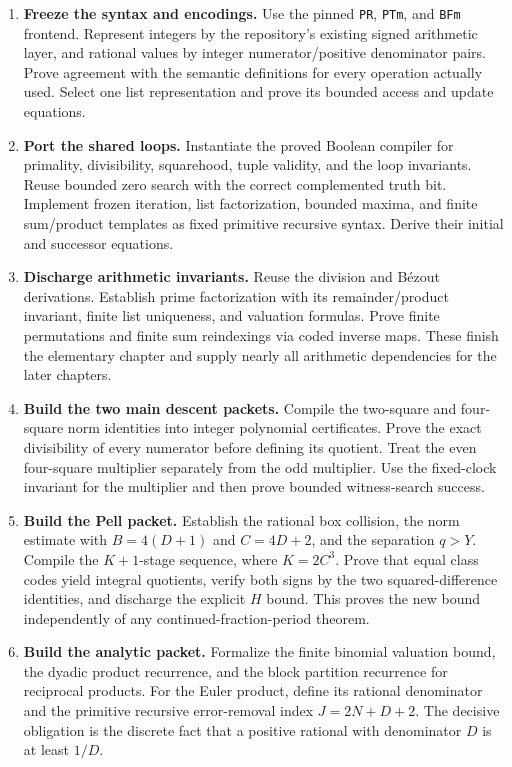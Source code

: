 \begin{enumerate}
\item \textbf{Freeze the syntax and encodings.} Use the pinned \texttt{PR}, \texttt{PTm}, and \texttt{BFm} frontend. Represent integers by the repository's existing signed arithmetic layer, and rational values by integer numerator/positive denominator pairs. Prove agreement with the semantic definitions for every operation actually used. Select one list representation and prove its bounded access and update equations.
\item \textbf{Port the shared loops.} Instantiate the proved Boolean compiler for primality, divisibility, squarehood, tuple validity, and the loop invariants. Reuse bounded zero search with the correct complemented truth bit. Implement frozen iteration, list factorization, bounded maxima, and finite sum/product templates as fixed primitive recursive syntax. Derive their initial and successor equations.
\item \textbf{Discharge arithmetic invariants.} Reuse the division and B\'ezout derivations. Establish prime factorization with its remainder/product invariant, finite list uniqueness, and valuation formulas. Prove finite permutations and finite sum reindexings via coded inverse maps. These finish the elementary chapter and supply nearly all arithmetic dependencies for the later chapters.
\item \textbf{Build the two main descent packets.} Compile the two-square and four-square norm identities into integer polynomial certificates. Prove the exact divisibility of every numerator before defining its quotient. Treat the even four-square multiplier separately from the odd multiplier. Use the fixed-clock invariant for the multiplier and then prove bounded witness-search success.
\item \textbf{Build the Pell packet.} Establish the rational box collision, the norm estimate with $B=4(D+1)$ and $C=4D+2$, and the separation $q>Y$. Compile the $K+1$-stage sequence, where $K=2C^3$. Prove that equal class codes yield integral quotients, verify both signs by the two squared-difference identities, and discharge the explicit $H$ bound. This proves the new bound independently of any continued-fraction-period theorem.
\item \textbf{Build the analytic packet.} Formalize the finite binomial valuation bound, the dyadic product recurrence, and the block partition recurrence for reciprocal products. For the Euler product, define its rational denominator and the primitive recursive error-removal index $J=2N+D+2$. The decisive obligation is the discrete fact that a positive rational with denominator $D$ is at least $1/D$.

\end{enumerate}
